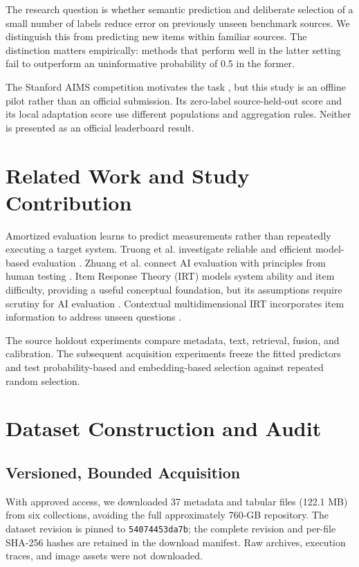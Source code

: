 \documentclass[conference]{IEEEtran}
\begin{document}
The research question is whether semantic prediction and deliberate selection of a small number of labels reduce error on previously unseen benchmark sources. We distinguish this from predicting new items within familiar sources. The distinction matters empirically: methods that perform well in the latter setting fail to outperform an uninformative probability of 0.5 in the former.

The Stanford AIMS competition motivates the task \cite{aims}, but this study is an offline pilot rather than an official submission. Its zero-label source-held-out score and its local adaptation score use different populations and aggregation rules. Neither is presented as an official leaderboard result.

\section{Related Work and Study Contribution}
Amortized evaluation learns to predict measurements rather than repeatedly executing a target system. Truong et al. investigate reliable and efficient model-based evaluation \cite{truong2025}. Zhuang et al. connect AI evaluation with principles from human testing \cite{zhuang2023}. Item Response Theory (IRT) models system ability and item difficulty, providing a useful conceptual foundation, but its assumptions require scrutiny for AI evaluation \cite{jiang2026}. Contextual multidimensional IRT incorporates item information to address unseen questions \cite{shang2026}.

The source holdout experiments compare metadata, text, retrieval, fusion, and calibration. The subsequent acquisition experiments freeze the fitted predictors and test probability-based and embedding-based selection against repeated random selection.

\section{Dataset Construction and Audit}
\subsection{Versioned, Bounded Acquisition}
With approved access, we downloaded 37 metadata and tabular files (122.1 MB) from six collections, avoiding the full approximately 760-GB repository. The dataset revision is pinned to \texttt{54074453da7b}; the complete revision and per-file SHA-256 hashes are retained in the download manifest. Raw archives, execution traces, and image assets were not downloaded.
\end{document}
